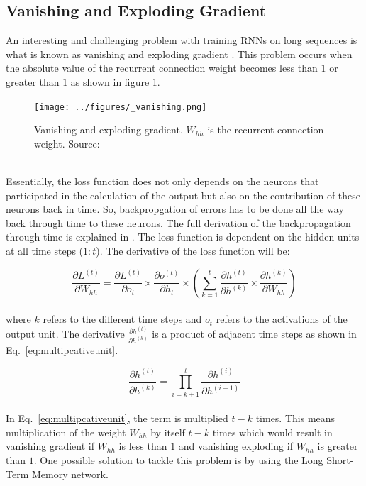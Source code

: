 \documentclass[sigconf, nonacm, natbib, screen, balance=False]{acmart}
\begin{document}
\subsection{Vanishing and Exploding Gradient}
An interesting and challenging problem with training RNNs on long sequences is what is known as vanishing and exploding gradient \citep{Pascanu2013OnTD}. This problem occurs when the absolute value of the recurrent connection weight becomes less than $1$ or greater than $1$ as shown in figure \ref{fig:vanishing}.    

\begin{figure}
  \centering
  \texttt{[image: ../figures/\_vanishing.png]}
  \caption{Vanishing and exploding gradient. $W_{hh}$ is the recurrent connection weight. Source: \citep{raschka2019python}}
  \label{fig:vanishing}
\end{figure}
\hfill\\
Essentially, the loss function does not only depends on the neurons that participated in the calculation of the output but also on the contribution of these neurons back in time. So, backpropgation of errors has to be done all the way back through time to these neurons. The full derivation of the backpropagation through time is explained in \citep{Werbos}. The loss function is dependent on the hidden units at all time steps ($1:t$). The derivative of the loss function will be:

\begin{equation}
     \frac{\partial L^{(t)}}{\partial W_{hh}} = \frac{\partial L^{(t)}}{\partial o_{t}} \times \frac{\partial o^{(t)}}{\partial h_{t}} \times \left(\sum_{k=1}^{t} \frac{\partial h^{(t)}}{\partial h^{(k)}} \times \frac{\partial h^{(k)}}{\partial W_{hh}}\right)
    \label{eq:gradientrnn}
\end{equation}
\hfill\\
where $k$ refers to the different time steps and $o_{t}$ refers to the activations of the output unit. The derivative $\frac{\partial h^{(t)}}{\partial h^{(k)}}$ is a product of adjacent time steps as shown in Eq.~\ref{eq:multipcativeunit}.

\begin{equation}
     \frac{\partial h^{(t)}}{\partial h^{(k)}} = \prod_{i = k+1}^{t}{\frac{\partial h^{(i)}}{\partial h^{(i-1)}}}  
    \label{eq:multipcativeunit}
\end{equation}
\hfill\\
In Eq.~\ref{eq:multipcativeunit}, the term is multiplied $t-k$ times. This means multiplication of the weight $W_{hh}$ by itself $t-k$ times which would result in vanishing gradient if $W_{hh}$ is less than $1$ and vanishing exploding if $W_{hh}$ is greater than $1$. One possible solution to tackle this problem is by using the Long Short-Term Memory network.   
\end{document}
